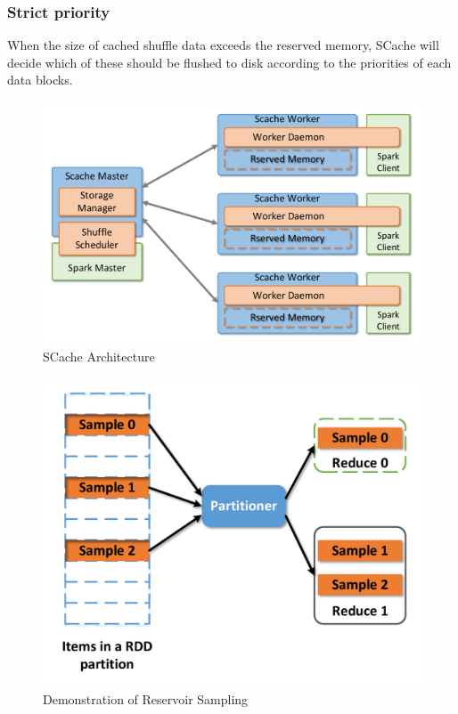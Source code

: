 \subsubsection{Strict priority}
When the size of cached shuffle data exceeds the reserved memory, SCache will decide which of these should be flushed to disk according to the priorities of each data blocks. 


\begin{figure}
	\centering
	\includegraphics[width=\linewidth]{fig/arch}
	\caption{SCache Architecture}
	\label{fig:arch}
\end{figure}
\begin{figure}
	\centering
	\includegraphics[width=\linewidth]{fig/sample}
	\caption{Demonstration of Reservoir Sampling}
	\label{fig:sample}
\end{figure}